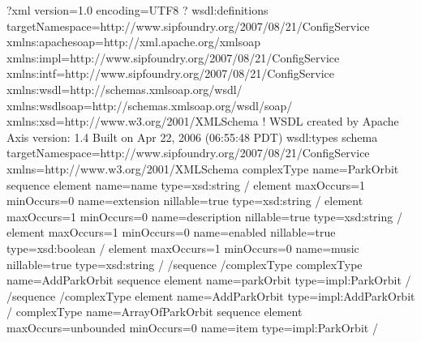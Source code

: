 \documentclass[letterpaper,10pt,english]{sphinxmanual}
\begin{document}
\begin{sphinxVerbatim}[commandchars=\\\{\}]
\PYGZlt{}?xml version=\PYGZdq{}1.0\PYGZdq{} encoding=\PYGZdq{}UTF\PYGZhy{}8\PYGZdq{} ?\PYGZgt{}
\PYGZlt{}wsdl:definitions targetNamespace=\PYGZdq{}http://www.sipfoundry.org/2007/08/21/ConfigService\PYGZdq{} xmlns:apachesoap=\PYGZdq{}http://xml.apache.org/xml\PYGZhy{}soap\PYGZdq{} xmlns:impl=\PYGZdq{}http://www.sipfoundry.org/2007/08/21/ConfigService\PYGZdq{} xmlns:intf=\PYGZdq{}http://www.sipfoundry.org/2007/08/21/ConfigService\PYGZdq{} xmlns:wsdl=\PYGZdq{}http://schemas.xmlsoap.org/wsdl/\PYGZdq{} xmlns:wsdlsoap=\PYGZdq{}http://schemas.xmlsoap.org/wsdl/soap/\PYGZdq{} xmlns:xsd=\PYGZdq{}http://www.w3.org/2001/XMLSchema\PYGZdq{}\PYGZgt{}
\PYGZhy{} \PYGZlt{}!\PYGZhy{}\PYGZhy{}
WSDL created by Apache Axis version: 1.4
Built on Apr 22, 2006 (06:55:48 PDT)
\PYGZhy{}\PYGZhy{}\PYGZgt{}
\PYGZlt{}wsdl:types\PYGZgt{}
\PYGZlt{}schema targetNamespace=\PYGZdq{}http://www.sipfoundry.org/2007/08/21/ConfigService\PYGZdq{} xmlns=\PYGZdq{}http://www.w3.org/2001/XMLSchema\PYGZdq{}\PYGZgt{}
\PYGZlt{}complexType name=\PYGZdq{}ParkOrbit\PYGZdq{}\PYGZgt{}
\PYGZlt{}sequence\PYGZgt{}
\PYGZlt{}element name=\PYGZdq{}name\PYGZdq{} type=\PYGZdq{}xsd:string\PYGZdq{} /\PYGZgt{}
\PYGZlt{}element maxOccurs=\PYGZdq{}1\PYGZdq{} minOccurs=\PYGZdq{}0\PYGZdq{} name=\PYGZdq{}extension\PYGZdq{} nillable=\PYGZdq{}true\PYGZdq{} type=\PYGZdq{}xsd:string\PYGZdq{} /\PYGZgt{}
\PYGZlt{}element maxOccurs=\PYGZdq{}1\PYGZdq{} minOccurs=\PYGZdq{}0\PYGZdq{} name=\PYGZdq{}description\PYGZdq{} nillable=\PYGZdq{}true\PYGZdq{} type=\PYGZdq{}xsd:string\PYGZdq{} /\PYGZgt{}
\PYGZlt{}element maxOccurs=\PYGZdq{}1\PYGZdq{} minOccurs=\PYGZdq{}0\PYGZdq{} name=\PYGZdq{}enabled\PYGZdq{} nillable=\PYGZdq{}true\PYGZdq{} type=\PYGZdq{}xsd:boolean\PYGZdq{} /\PYGZgt{}
\PYGZlt{}element maxOccurs=\PYGZdq{}1\PYGZdq{} minOccurs=\PYGZdq{}0\PYGZdq{} name=\PYGZdq{}music\PYGZdq{} nillable=\PYGZdq{}true\PYGZdq{} type=\PYGZdq{}xsd:string\PYGZdq{} /\PYGZgt{}
\PYGZlt{}/sequence\PYGZgt{}
\PYGZlt{}/complexType\PYGZgt{}
\PYGZlt{}complexType name=\PYGZdq{}AddParkOrbit\PYGZdq{}\PYGZgt{}
\PYGZlt{}sequence\PYGZgt{}
\PYGZlt{}element name=\PYGZdq{}parkOrbit\PYGZdq{} type=\PYGZdq{}impl:ParkOrbit\PYGZdq{} /\PYGZgt{}
\PYGZlt{}/sequence\PYGZgt{}
\PYGZlt{}/complexType\PYGZgt{}
\PYGZlt{}element name=\PYGZdq{}AddParkOrbit\PYGZdq{} type=\PYGZdq{}impl:AddParkOrbit\PYGZdq{} /\PYGZgt{}
\PYGZlt{}complexType name=\PYGZdq{}ArrayOfParkOrbit\PYGZdq{}\PYGZgt{}
\PYGZlt{}sequence\PYGZgt{}
\PYGZlt{}element maxOccurs=\PYGZdq{}unbounded\PYGZdq{} minOccurs=\PYGZdq{}0\PYGZdq{} name=\PYGZdq{}item\PYGZdq{} type=\PYGZdq{}impl:ParkOrbit\PYGZdq{} /\PYGZgt{}

\end{sphinxVerbatim}
\end{document}
